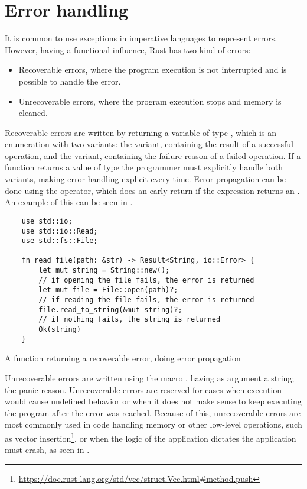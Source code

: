 \section{Error handling}

It is common to use exceptions in imperative languages to represent errors.
However, having a functional influence, Rust has two kind of errors: 

\begin{itemize}
    \item Recoverable errors, where the program execution is not interrupted and
        is possible to handle the error.
    \item Unrecoverable errors, where the program execution stops and memory is
        cleaned.
\end{itemize}

Recoverable errors are written by returning a variable of type , which is an enumeration with two variants: the 
variant, containing the result of a successful operation, and the 
variant, containing the failure reason of a failed operation. If a function
returns a value of type  the programmer must explicitly
handle both variants, making error handling explicit every time. Error
propagation can be done using the  operator, which does an early
return if the expression returns an . An example of this can be
seen in .

\begin{listing}[h]
	\begin{verbatim}
    use std::io;
    use std::io::Read;
    use std::fs::File;

    fn read_file(path: &str) -> Result<String, io::Error> {
        let mut string = String::new();
        // if opening the file fails, the error is returned
        let mut file = File::open(path)?;
        // if reading the file fails, the error is returned
        file.read_to_string(&mut string)?;
        // if nothing fails, the string is returned
        Ok(string)
    }
    \end{verbatim}
  \caption{A function returning a recoverable error, doing error propagation}
  \label{lst:recoverable_error}
\end{listing}

Unrecoverable errors are written using the macro , having as
argument a string; the panic reason. Unrecoverable errors are reserved for
cases when execution would cause undefined behavior or when it does not make
sense to keep executing the program after the error was reached. Because of
this, unrecoverable errors are most commonly used in code handling memory or
other low-level operations, such as vector
insertion\footnote{\url{https://doc.rust-lang.org/std/vec/struct.Vec.html\#method.push}},
or when the logic of the application dictates the application must crash, as
seen in .


